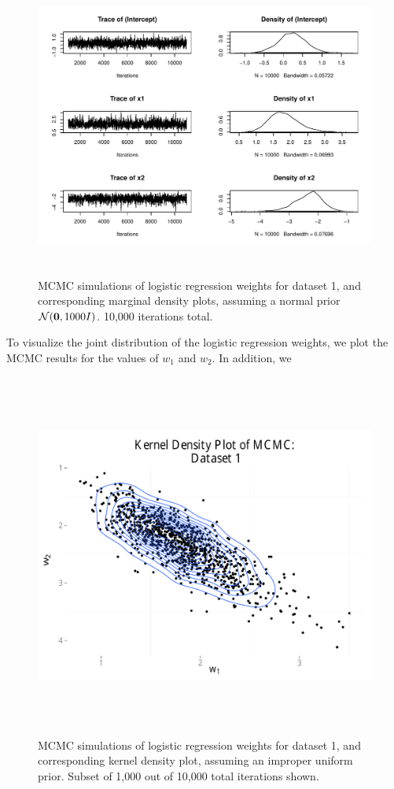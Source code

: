 \begin{figure}
\centering
	\includegraphics[height=100mm]{figures/mcmc_normal.pdf}
    \caption{MCMC simulations of logistic regression weights for dataset 1, and corresponding marginal density plots, assuming 
    a normal prior $\mathcal{N}(\boldsymbol{\mathbf{0}},1000I)$. 10,000 iterations total.}  \label{fig:mcmc_iterations_normal}  
\end{figure}

To visualize the joint distribution of the logistic regression weights, we plot the MCMC results for the values of $w_1$ and $w_2$.  In addition, we 




\begin{figure}
\centering
	\includegraphics[height=120mm]{figures/mcmc_uniform_2d.pdf}
    \caption{MCMC simulations of logistic regression weights for dataset 1, and corresponding kernel density plot, assuming 
    an improper uniform prior.  Subset of 1,000 out of 10,000 total iterations shown.}  \label{fig:mcmc_kernel}  
\end{figure}

